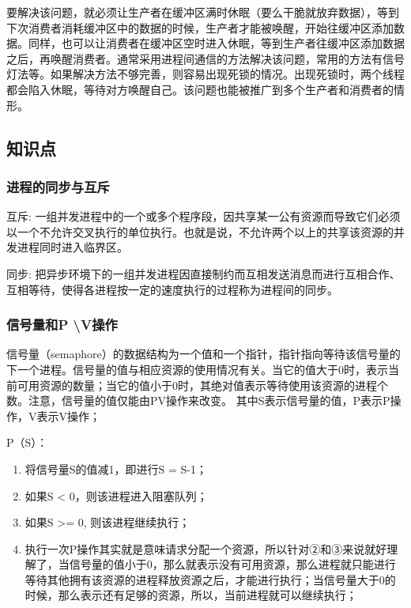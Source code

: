 \documentclass[withoutpreface,bwprint]{cumcmthesis} %
\begin{document}
要解决该问题，就必须让生产者在缓冲区满时休眠（要么干脆就放弃数据），等到下次消费者消耗缓冲区中的数据的时候，生产者才能被唤醒，开始往缓冲区添加数据。同样，也可以让消费者在缓冲区空时进入休眠，等到生产者往缓冲区添加数据之后，再唤醒消费者。通常采用进程间通信的方法解决该问题，常用的方法有信号灯法等。如果解决方法不够完善，则容易出现死锁的情况。出现死锁时，两个线程都会陷入休眠，等待对方唤醒自己。该问题也能被推广到多个生产者和消费者的情形。

\subsection{知识点}

\subsubsection{进程的同步与互斥}
互斥: 一组并发进程中的一个或多个程序段，因共享某一公有资源而导致它们必须以一个不允许交叉执行的单位执行。也就是说，不允许两个以上的共享该资源的并发进程同时进入临界区。

同步: 把异步环境下的一组并发进程因直接制约而互相发送消息而进行互相合作、互相等待，使得各进程按一定的速度执行的过程称为进程间的同步。
\subsubsection{信号量和P \textbackslash V操作}
信号量（semaphore）的数据结构为一个值和一个指针，指针指向等待该信号量的下一个进程。信号量的值与相应资源的使用情况有关。当它的值大于0时，表示当前可用资源的数量；当它的值小于0时，其绝对值表示等待使用该资源的进程个数。注意，信号量的值仅能由PV操作来改变。
其中S表示信号量的值，P表示P操作，V表示V操作；   

P（S）：
\begin{enumerate}[itemindent=2em]  %
    \item 将信号量S的值减1，即进行S = S-1；
    \item 如果S < 0，则该进程进入阻塞队列；
    \item 如果S >= 0, 则该进程继续执行；
    \item 执行一次P操作其实就是意味请求分配一个资源，所以针对②和③来说就好理解了，当信号量的值小于0，那么就表示没有可用资源，那么进程就只能进行等待其他拥有该资源的进程释放资源之后，才能进行执行；当信号量大于0的时候，那么表示还有足够的资源，所以，当前进程就可以继续执行；

\end{enumerate}
         
\end{document}

